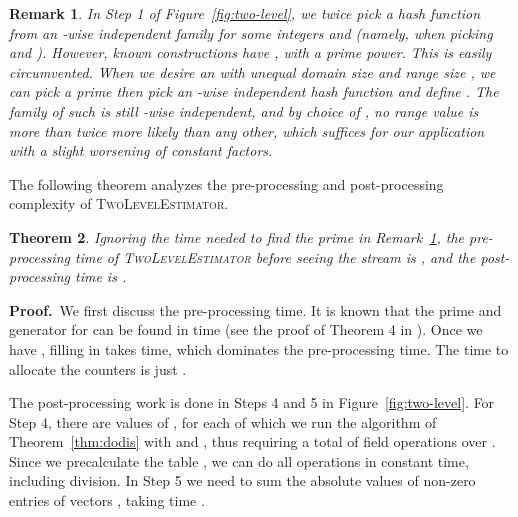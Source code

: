 \documentclass[letterpaper,11pt]{article}
\newcommand{\RemarkName}[1]{\label{rem:#1}}
\newcommand{\TheoremName}[1]{\label{thm:#1}}
\newcommand{\Remark}[1]{Remark~\ref{rem:#1}}
\newcommand{\Theorem}[1]{Theorem~\ref{thm:#1}}
\newcommand{\Figure}[1]{Figure~\ref{fig:#1}}
\newtheorem{theorem}{Theorem}\newtheorem{corollary}[theorem]{Corollary}
\newtheorem{remark}[theorem]{Remark}
\newcommand{\proofbelow}{3pt}
\newcommand{\afterproof}{\hfill  \par \vspace{\proofbelow}}
\renewenvironment{proof}{\noindent\textbf{Proof.}\,}{\afterproof}
\begin{document}
\begin{remark}\RemarkName{hash-stuff}
In Step 1 of \Figure{two-level}, we twice pick a hash function
 from an -wise independent family for
some integers  and  (namely, when picking  and
). However, known
constructions \cite{CW79} have , with  a prime power.  This is
easily circumvented.
When we desire an  with unequal domain size  and range size ,
we can pick a prime  then pick an -wise independent hash function
 and define . The family of such  is still -wise independent, and by
choice of , no range value is more than twice more likely than any
other, which suffices for our application with a slight worsening of
constant factors.
\end{remark}

The following theorem analyzes the pre-processing and post-processing
complexity of \textsc{TwoLevelEstimator}.

\begin{theorem}\TheoremName{tle-preprocess}
Ignoring the time needed to find the prime  in \Remark{hash-stuff},
the pre-processing time of \textsc{TwoLevelEstimator} before
seeing the stream is , and the post-processing time is
.
\end{theorem}
\begin{proof}
We first discuss the pre-processing time.  It is known that the prime
 and generator  for  can be found in time
 (see the proof of Theorem 4 in
\cite{BM84}). Once we have , filling in
 takes  time, which dominates the
pre-processing time.  The time to allocate the
 counters  is just .

The post-processing work is done in Steps 4
and 5 in \Figure{two-level}. For Step 4, there are 
values of , for each of which we run the algorithm of
\Theorem{dodis} with  and , thus
requiring a total of  field
operations over .  Since we precalculate the table , we
can do all  operations in constant time, including
division. In
Step 5 we need to sum the absolute values of  non-zero
entries of  vectors , taking time .
\end{proof}
\end{document}
